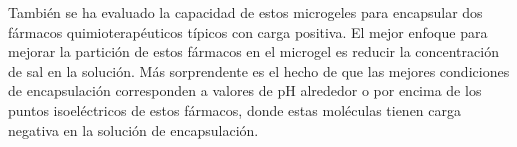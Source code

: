 Tambi\'en se ha evaluado la capacidad de estos microgeles para encapsular dos f\'armacos quimioterap\'euticos t\'ipicos con carga positiva.
El mejor enfoque para mejorar la partici\'on de estos f\'armacos en el microgel es reducir la concentraci\'on de sal en la soluci\'on.
M\'as sorprendente es el hecho de que las mejores condiciones de encapsulaci\'on corresponden a valores de pH alrededor o por encima de los puntos isoel\'ectricos de estos f\'armacos, donde estas mol\'eculas tienen carga negativa en la soluci\'on de encapsulaci\'on. 